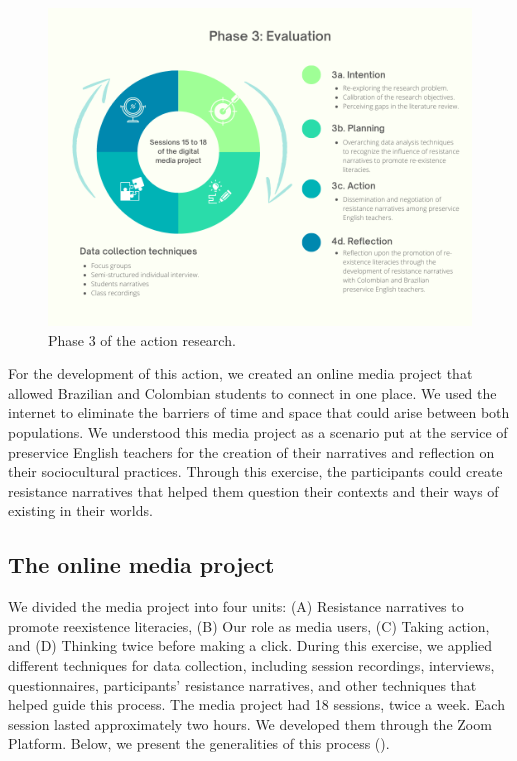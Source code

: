\documentclass[english]{textolivre}
\begin{document}
\begin{figure}[h!]
    \centering
    \includegraphics[width=0.8\linewidth]{Fig3.png}
    \caption{Phase 3 of the action research.}
    \label{fig3}
\end{figure}

For the development of this action, we created an online media project that allowed Brazilian and Colombian students to connect in one place. We used the internet to eliminate the barriers of time and space that could arise between both populations. We understood this media project as a scenario put at the service of preservice English teachers for the creation of their narratives and reflection on their sociocultural practices. Through this exercise, the participants could create resistance narratives that helped them question their contexts and their ways of existing in their worlds.

\subsection{The online media project}\label{sec-organizacao}
We divided the media project into four units: (A) Resistance narratives to promote reexistence literacies, (B) Our role as media users, (C) Taking action, and (D) Thinking twice before making a click. During this exercise, we applied different techniques for data collection, including session recordings, interviews, questionnaires, participants’ resistance narratives, and other techniques that helped guide this process. The media project had 18 sessions, twice a week. Each session lasted approximately two hours. We developed them through the Zoom Platform. Below, we present the generalities of this process ().



\end{document}

